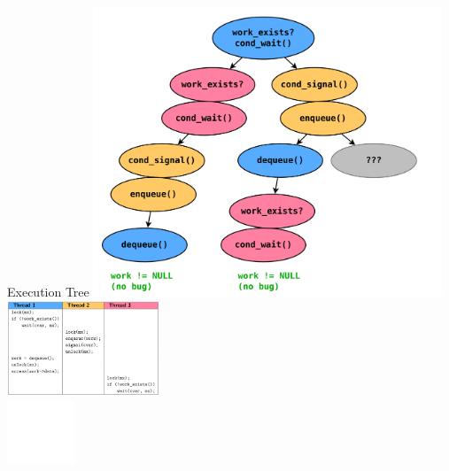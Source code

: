 \documentclass[xcolor=dvipsnames]{beamer}
\begin{document}
\begin{frame}{Execution Tree}
		\includegraphics[width=0.78\textwidth]{execution-tree-2.pdf} \\
		\vspace{-3in}
		\hspace{3in}
		\includegraphics[width=0.34\textwidth]{table-1.png}
		\\
		\vspace{1.2in}
		\hspace{3.7in}
		\includegraphics[width=0.15\textwidth]{frownie-blank.png}
\end{frame}
\end{document}
